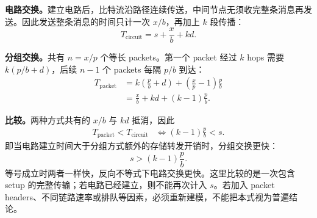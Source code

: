 \begin{checkedsolution}
\textbf{电路交换。}建立电路后，比特流沿路径连续传送，中间节点无须收完整条消息再发送。因此发送整条消息的时间只计一次 $x/b$，再加上 $k$ 段传播：
\[
  \boxed{T_{\mathrm{circuit}}=s+\frac{x}{b}+kd}.
\]

\begin{samepage}
\textbf{分组交换。}共有 $n=x/p$ 个等长 packets。第一个 packet 经过 $k$ hops 需要 $k(p/b+d)$，后续 $n-1$ 个 packets 每隔 $p/b$ 到达：
\[
\begin{aligned}
  T_{\mathrm{packet}}
    &=k\left(\frac{p}{b}+d\right)
      +\left(\frac{x}{p}-1\right)\frac{p}{b}\\
    &=\boxed{\frac{x}{b}+kd+(k-1)\frac{p}{b}}.
\end{aligned}
\]
\end{samepage}

\textbf{比较。}两种方式共有的 $x/b$ 与 $kd$ 抵消，因此
\[
\begin{aligned}
  T_{\mathrm{packet}}<T_{\mathrm{circuit}}
  &\iff (k-1)\frac{p}{b}<s.
\end{aligned}
\]
即当电路建立时间大于分组方式额外的存储转发开销时，分组交换更快：
\[
  \boxed{s>(k-1)\frac{p}{b}}.
\]
等号成立时两者一样快，反向不等式下电路交换更快。这里比较的是一次包含 setup 的完整传输；若电路已经建立，则不能再次计入 $s$。若加入 packet headers、不同链路速率或排队等因素，必须重新建模，不能把本式视为普遍结论。
\end{checkedsolution}
